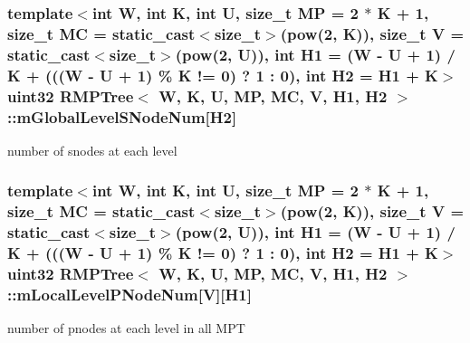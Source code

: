 \hypertarget{classRMPTree_a2435f801f07587babed1853cdb04b078}{
\subsubsection[{m\-Global\-Level\-S\-Node\-Num}]{\setlength{\rightskip}{0pt plus 5cm}template$<$int W, int K, int U, size\-\_\-t M\-P = 2 $\ast$ K + 1, size\-\_\-t M\-C = static\-\_\-cast$<$size\-\_\-t$>$(pow(2, K)), size\-\_\-t V = static\-\_\-cast$<$size\-\_\-t$>$(pow(2, U)), int H1 = (\-W -\/ U + 1) / K + (((\-W -\/ U + 1) \% K != 0) ? 1 \-: 0), int H2 = H1 + K$>$ {\bf uint32} {\bf R\-M\-P\-Tree}$<$ {\bf W}, K, U, M\-P, M\-C, V, H1, H2 $>$\-::m\-Global\-Level\-S\-Node\-Num\mbox{[}H2\mbox{]}\hspace{0.3cm}{\ttfamily [private]}}}\label{classRMPTree_a2435f801f07587babed1853cdb04b078}


number of snodes at each level 

\hypertarget{classRMPTree_a80594c79c981b7599d05b39c8701fbb8}{
\subsubsection[{m\-Local\-Level\-P\-Node\-Num}]{\setlength{\rightskip}{0pt plus 5cm}template$<$int W, int K, int U, size\-\_\-t M\-P = 2 $\ast$ K + 1, size\-\_\-t M\-C = static\-\_\-cast$<$size\-\_\-t$>$(pow(2, K)), size\-\_\-t V = static\-\_\-cast$<$size\-\_\-t$>$(pow(2, U)), int H1 = (\-W -\/ U + 1) / K + (((\-W -\/ U + 1) \% K != 0) ? 1 \-: 0), int H2 = H1 + K$>$ {\bf uint32} {\bf R\-M\-P\-Tree}$<$ {\bf W}, K, U, M\-P, M\-C, V, H1, H2 $>$\-::m\-Local\-Level\-P\-Node\-Num\mbox{[}V\mbox{]}\mbox{[}H1\mbox{]}\hspace{0.3cm}{\ttfamily [private]}}}\label{classRMPTree_a80594c79c981b7599d05b39c8701fbb8}


number of pnodes at each level in all M\-P\-T 

